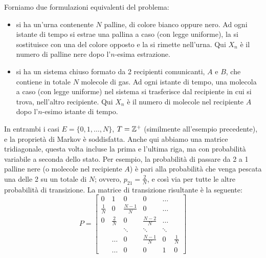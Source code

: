 \begin{ese} \label{urna-ehren}
	Forniamo due formulazioni equivalenti del problema:
	\begin{itemize}
		\item si ha un'urna contenente $N$ palline, di colore bianco oppure nero. Ad ogni istante di tempo si estrae una pallina a caso (con legge uniforme),
			la si sostituisce con una del colore opposto e la si rimette nell'urna. Qui $X_n$ è il numero di palline nere dopo l'$n$-esima estrazione.
		\item si ha un sistema chiuso formato da 2 recipienti comunicanti, $A$ e $B$, che contiene in totale $N$ molecole di gas.
			Ad ogni istante di tempo, una molecola a caso (con legge uniforme) nel sistema si trasferisce dal recipiente in cui si trova, nell'altro recipiente.
			Qui $X_n$ è il numero di molecole nel recipiente $A$ dopo l'$n$-esimo istante di tempo.
	\end{itemize}
	In entrambi i casi $E = \{0,1,\dots,N\}$, $T = \mathbb Z^+$ (similmente all'esempio precedente), e la proprietà di Markov è soddisfatta.
	Anche qui abbiamo una matrice tridiagonale, questa volta incluse la prima e l'ultima riga, ma con probabilità variabile a seconda dello stato.
	Per esempio, la probabilità di passare da 2 a 1 palline nere (o molecole nel recipiente $A$) è pari alla probabilità che venga pescata una delle 2 su un totale di $N$; ovvero, $p_{21} = \frac 2 N$, e così via per tutte le altre probabilità di transizione.
	La matrice di transizione risultante è la seguente:
	$$P = \begin{bmatrix}
	0 & 1 & 0 & 0 & \dots \\
	\frac 1 N & 0 & \frac{N-1}N & 0 & \dots \\
	0 & \frac 2 N & 0 & \frac{N-2}N & \dots \\
	&& \ddots & \ddots & \ddots \\
	& \dots & 0 & \frac{N-1}N & 0 & \frac 1 N \\
	& \dots & 0 & 0 & 1 & 0
	\end{bmatrix}$$
\end{ese}
